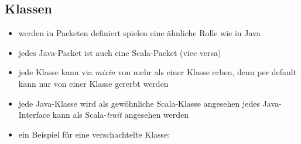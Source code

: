 \subsection{Klassen}
\begin{itemize}
  \item werden in Packeten definiert \und spielen eine ähnliche Rolle wie
  in Java
  \item jedes Java-Packet ist auch eine Scala-Packet (vice versa)
  \item jede Klasse kann via \textit{mixin} von mehr als einer Klasse
  erben, denn per default kann nur von einer Klasse gererbt werden
  \item jede Java-Klasse wird als gewöhnliche Scala-Klasse angesehen \und 
  jedes Java-Interface kann als Scala-\textit{trait} angesehen werden
  \item ein Beispiel für eine verschachtelte Klasse:
  
  
\end{itemize}


